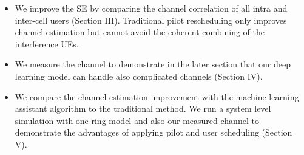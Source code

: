 \begin{itemize}
\item We improve the SE by comparing the channel correlation of all intra and inter-cell users (Section III). Traditional pilot rescheduling only improves channel estimation but cannot avoid the coherent combining of the interference UEs.
\item We measure the channel to demonstrate in the later section that our deep learning model can handle also complicated channels (Section IV). 
\item We compare the channel estimation improvement with the machine learning assistant algorithm to the traditional method. We run a system level simulation with one-ring model and also our measured channel to demonstrate the advantages of applying pilot and user scheduling (Section V).
\end{itemize}


